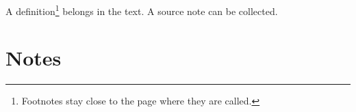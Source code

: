 \documentclass{article}
\begin{document}
A definition\footnote{Footnotes stay close to the page where they are called.} belongs in the text.
A source note can be collected.
\section*{Notes}\theendnotes
\end{document}
